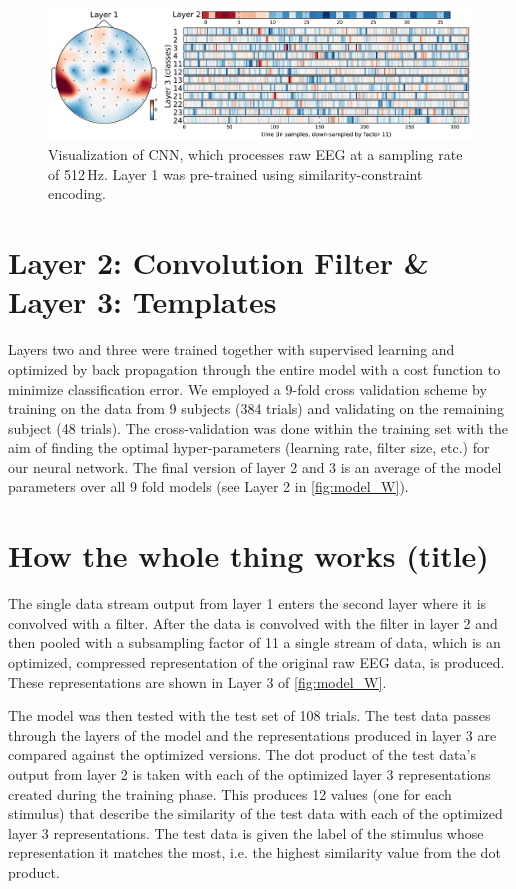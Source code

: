 \begin{figure}[h] 
  \begin{center}
    \includegraphics[width=\textwidth,keepaspectratio=true]{Figures/model_W}
    \caption{Visualization of \ac{CNN}, which processes raw EEG at a sampling rate of 512\,Hz.
    Layer 1 was pre-trained using similarity-constraint encoding.}
    \label{fig:model_W}
  \end{center}
\end{figure}
\section{Layer 2: Convolution Filter \& Layer 3: Templates}
Layers two and three were trained together with supervised learning and optimized by back propagation through the entire model with a cost function to minimize classification error.
We employed a 9-fold cross validation scheme by training on the data from 9 subjects (384 trials) and validating on the remaining subject (48 trials).
The cross-validation was done within the training set with the aim of finding the optimal hyper-parameters (learning rate, filter size, etc.) for our neural network. 
The final version of layer 2 and 3 is an average of the model parameters over all 9 fold models (see Layer 2 in \autoref{fig:model_W}).
\section{How the whole thing works (title)}
The single data stream output from layer 1 enters the second layer where it is convolved with a filter. 
After the data is convolved with the filter in layer 2 and then pooled with a subsampling factor of 11 a single stream of data, which is an optimized, compressed representation of the original raw EEG data, is produced.
These representations are shown in Layer 3 of \autoref{fig:model_W}. 

The model was then tested with the test set of 108 trials. 
The test data passes through the layers of the model and the representations produced in layer 3 are compared against the optimized versions. 
The dot product of the test data's output from layer 2 is taken with each of the optimized layer 3 representations created during the training phase. 
This produces 12 values (one for each stimulus) that describe the similarity of the test data with each of the optimized layer 3 representations. 
The test data is given the label of the stimulus whose representation it matches the most, i.e. the highest similarity value from the dot product. 